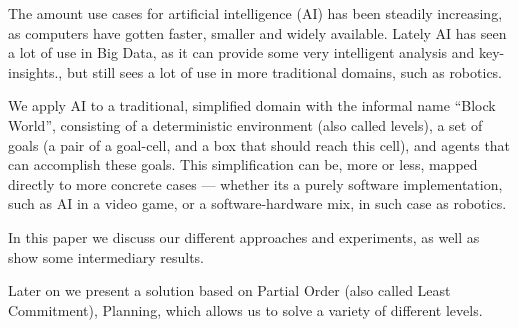 \documentclass[Main]{subfiles}
\begin{document}
The amount use cases for artificial intelligence (AI) has been steadily increasing, as computers have gotten faster, smaller and widely available.
Lately AI has seen a lot of use in Big Data, as it can provide some very intelligent analysis and key-insights.\cite{OLeary2013},
but still sees a lot of use in more traditional domains, such as robotics.

We apply AI to a traditional, simplified domain with the informal name ``Block World'', consisting of a deterministic environment (also called levels), a set of goals (a pair of a goal-cell, and a box that should reach this cell), and agents that can accomplish these goals.
This simplification can be, more or less, mapped directly to more concrete cases --- 
whether its a purely software implementation, such as AI in a video game, or a software-hardware mix, in such case as robotics.

In this paper we discuss our different approaches and experiments, as well as show some intermediary results.

Later on we present a solution based on Partial Order (also called Least Commitment), Planning, 
which allows us to solve a variety of different levels. 
\end{document}
